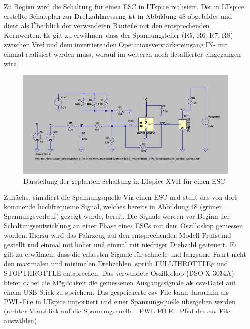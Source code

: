 Zu Beginn wird die Schaltung für einen ESC in LTspice realisiert. Der in LTspice erstellte Schaltplan zur Drehzahlmessung ist in Abbildung 48 abgebildet und dient als Überblick der verwendeten Bauteile mit den entsprechenden Kennwerten. Es gilt zu erwähnen, dass der Spannungsteiler (R5, R6, R7, R8) zwischen Vref und dem invertierenden Operationsverstärkereingang IN- nur einmal realisiert werden muss, worauf im weiteren noch detallierter eingegangen wird.

\begin{figure}[H] %
\includegraphics[width=.95\textwidth]{sec4/images/Schaltungsaufbau} 
\centering
\captionsetup{width=.95\textwidth}
\caption[Schaltungsaufbau]{Darstellung der geplanten Schaltung in LTspice XVII für einen ESC}\centering
\label{fig:Schaltungsaufbau}
\end{figure}

Zunächst simuliert die Spannungsquelle Vin einen ESC und stellt das von dort kommende hochfrequente Signal, welches bereits in Abbildung 48 (grüner Spannungsverlauf) gezeigt wurde, bereit. Die Signale werden vor Beginn der Schaltungsentwicklung an einer Phase eines ESCs mit dem Oszilloskop gemessen worden. Hierzu wird das Fahrzeug auf den entsprechenden Modell-Prüfstand gestellt und einmal mit hoher und einmal mit niedriger Drehzahl gesteuert. Es gilt zu erwähnen, dass die erfassten Signale für schnelle und langsame Fahrt nicht den maximalen und minimalen Drehzahlen, sprich \glqq{}FULLTHROTTLEg\grqq{} und \glqq{}STOPTHROTTLE \grqq{} entsprechen. Das verwendete Oszilloskop (DSO-X 3034A) bietet dabei die Möglichkeit die gemessenen Ausgangssignale als csv-Datei auf einem USB-Stick zu speichern. Das gespeicherte csv-File kann daraufhin als PWL-File in LTspice importiert und einer Spannungsquelle übergeben werden (rechter Mausklick auf die Spannungsquelle - PWL FILE - Pfad des csv-File auswählen).\vspace{11pt}

